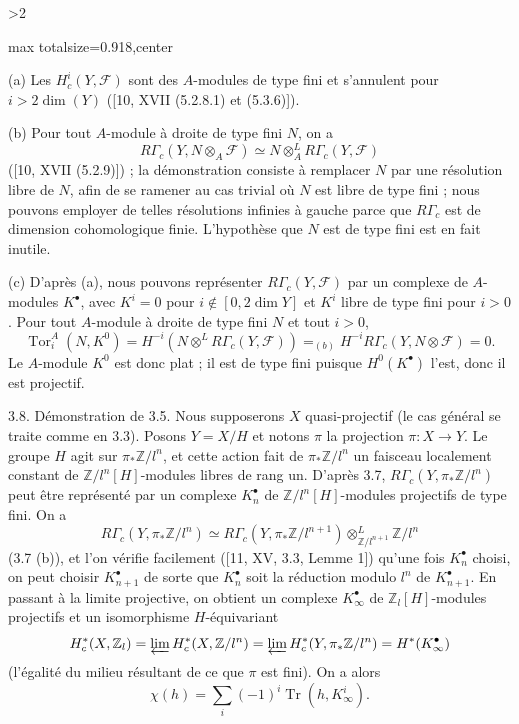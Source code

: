 \documentclass[9pt,twoside]{extarticle}
\newcommand{\EditionPage}[3]{%
  \ifnum#1>2\clearpage\fi
  \pdfbookmark[1]{Printed page #2}{fr-folio-#2}%
  \hypertarget{fr-physical-#1}{}%
  \noindent\begin{adjustbox}{max totalsize={\textwidth}{0.918\textheight},center}
  \begin{minipage}[t]{\textwidth}
  \fontsize{9.4}{11.1}\selectfont\justifying
  #3
  \end{minipage}
  \end{adjustbox}%
}
\begin{document}
\EditionPage{20}{121}{%
(a) Les \(H_c^i(Y,\mathcal F)\) sont des \(A\)-modules de type fini et s'annulent pour \(i>2\dim(Y)\) ([10, XVII (5.2.8.1) et (5.3.6)]).\par

(b) Pour tout \(A\)-module à droite de type fini \(N\), on a \[
R\Gamma_c(Y,N\otimes_A\mathcal F)
\simeq
N\otimes_A^L R\Gamma_c(Y,\mathcal F)
\] ([10, XVII (5.2.9)]) ; la démonstration consiste à remplacer \(N\) par une résolution libre de \(N\), afin de se ramener au cas trivial où \(N\) est libre de type fini ; nous pouvons employer de telles résolutions infinies à gauche parce que \(R\Gamma_c\) est de dimension cohomologique finie. L'hypothèse que \(N\) est de type fini est en fait inutile.\par

(c) D'après (a), nous pouvons représenter \(R\Gamma_c(Y,\mathcal F)\) par un complexe de \(A\)-modules \(K^\bullet\), avec \(K^i=0\) pour \(i\notin[0,2\dim Y]\) et \(K^i\) libre de type fini pour \(i>0\). Pour tout \(A\)-module à droite de type fini \(N\) et tout \(i>0\), \[
\operatorname{Tor}_i^A(N,K^0)
=
H^{-i}(N\otimes^L R\Gamma_c(Y,\mathcal F))
\mathrel{=}_{(b)}
H^{-i}R\Gamma_c(Y,N\otimes\mathcal F)
=0.
\] Le \(A\)-module \(K^0\) est donc plat ; il est de type fini puisque \(H^0(K^\bullet)\) l'est, donc il est projectif.\par

3.8. Démonstration de 3.5. Nous supposerons \(X\) quasi-projectif (le cas général se traite comme en 3.3). Posons \(Y=X/H\) et notons \(\pi\) la projection \(\pi:X\to Y\). Le groupe \(H\) agit sur \(\pi_*\mathbb Z/l^n\), et cette action fait de \(\pi_*\mathbb Z/l^n\) un faisceau localement constant de \(\mathbb Z/l^n[H]\)-modules libres de rang un. D'après 3.7, \(R\Gamma_c(Y,\pi_*\mathbb Z/l^n)\) peut être représenté par un complexe \(K_n^\bullet\) de \(\mathbb Z/l^n[H]\)-modules projectifs de type fini. On a \[
R\Gamma_c(Y,\pi_*\mathbb Z/l^n)
\simeq
R\Gamma_c(Y,\pi_*\mathbb Z/l^{n+1})
\otimes^L_{\mathbb Z/l^{n+1}}\mathbb Z/l^n
\] (3.7 (b)), et l'on vérifie facilement ([11, XV, 3.3, Lemme 1]) qu'une fois \(K_n^\bullet\) choisi, on peut choisir \(K_{n+1}^\bullet\) de sorte que \(K_n^\bullet\) soit la réduction modulo \(l^n\) de \(K_{n+1}^\bullet\). En passant à la limite projective, on obtient un complexe \(K_\infty^\bullet\) de \(\mathbb Z_l[H]\)-modules projectifs et un isomorphisme \(H\)-équivariant \[
H_c^*(X,\mathbb Z_l)
=
\varprojlim H_c^*(X,\mathbb Z/l^n)
=
\varprojlim H_c^*(Y,\pi_*\mathbb Z/l^n)
=
H^*(K_\infty^\bullet)
\] (l'égalité du milieu résultant de ce que \(\pi\) est fini). On a alors \[
\chi(h)=\sum_i(-1)^i\operatorname{Tr}(h,K_\infty^i).
\]\par

}
\end{document}
